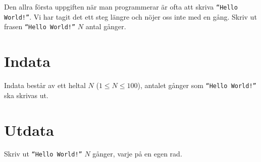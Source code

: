 Den allra första uppgiften när man programmerar är ofta att skriva \texttt{``Hello World!''}. Vi har tagit
det ett steg längre och nöjer oss inte med en gång. Skriv ut frasen \texttt{``Hello World!''} $N$ antal gånger.

\section*{Indata}
Indata består av ett heltal $N$ ($1 \leq N \leq 100$), antalet gånger som \texttt{``Hello World!''} ska
skrivas ut.

\section*{Utdata}
Skriv ut \texttt{``Hello World!''} $N$ gånger, varje på en egen rad.
